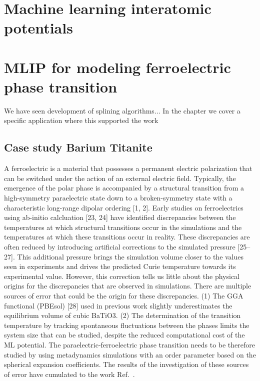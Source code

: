 \chapter{Machine learning interatomic potentials}

\chapter{MLIP for modeling ferroelectric phase transition}
We have seen development of splining algorithms...
In the chapter we cover a specific application where this supported the work

\section{Case study Barium Titanite}
A ferroelectric is a material that possesses a permanent electric polarization that can be switched under the action of an external electric field.
Typically, the emergence of the polar phase is accompanied by a structural transition from a high-symmetry paraelectric state down to a broken-symmetry state with a characteristic long-range dipolar ordering [1, 2].
Early studies on ferroelectrics using ab-initio calcluation [23, 24] have identified discrepancies between the temperatures at which structural transitions occur in the simulations and the temperatures at which these transitions occur in reality.
These discrepancies are often reduced by introducing artificial corrections to the simulated pressure [25–27].
This additional pressure brings the simulation volume closer to the values seen in experiments and drives the predicted Curie temperature towards its experimental value.
However, this correction tells us little about the physical origins for the discrepancies that are observed in simulations.
There are multiple sources of error that could be the origin for these discrepancies.
(1) The GGA functional (PBEsol) [28] used in previous work slightly underestimates the equilibrium volume of cubic BaTiO3.
(2) The determination of the transition temperature by tracking spontaneous fluctuations between the phases limits the system size that can be studied, despite the reduced computational cost of the ML potential.
The paraelectric-ferroelectric phase transition needs to be therefore studied by using metadynamics simulations with an order parameter based on the spherical expansion coefficients.
The results of the investigation of these sources of error have cumulated to the work Ref.~\cite{TODO}.
